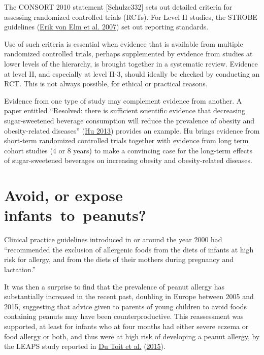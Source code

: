 \documentclass[
  10pt,
  b5paper]{book}
\begin{document}
The CONSORT 2010 statement {[}Schulzc332{]} sets out detailed criteria
for assessing randomized controlled trials (RCTs). For Level II
studies, the STROBE guidelines (\protect\hyperlink{ref-erik2007strengthening}{Erik von Elm et al. 2007}) set out
reporting standards.

Use of such criteria is essential when evidence that is available
from multiple randomized controlled trials, perhaps supplemented
by evidence from studies at lower levels of the hierarchy, is
brought together in a systematic review. Evidence at level II,
and especially at level II-3, should ideally be checked by
conducting an RCT. This is not always possible, for ethical or
practical reasons.

Evidence from one type of study may complement evidence from
another. A paper entitled ``Resolved: there is sufficient
scientific evidence that decreasing sugar-sweetened beverage
consumption will reduce the prevalence of obesity and
obesity-related diseases'' (\protect\hyperlink{ref-hu2013resolved}{Hu 2013}) provides an
example. Hu brings evidence from short-term randomized
controlled trials together with evidence from long term
cohort studies (4 or 8 years) to make a convincing case
for the long-term effects of sugar-sweetened beverages on
increasing obesity and obesity-related diseases.

\hypertarget{avoid-or-expose-infants-to-peanuts}{%
\section{Avoid, or expose infants~to~peanuts?}\label{avoid-or-expose-infants-to-peanuts}}

Clinical practice guidelines introduced in or around the
year 2000 had ``recommended the exclusion of
allergenic foods from the diets of infants at high risk for
allergy, and from the diets of their mothers during pregnancy
and lactation.''

It was then a surprise to find that
the prevalence of peanut allergy has substantially increased
in the recent past, doubling in Europe between 2005 and 2015,
suggesting that advice given to parents of young children to
avoid foods containing peanuts may have been counterproductive.
This reassessment was supported, at least for infants who
at four months had either severe eczema or food allergy or
both, and thus were at high risk of developing a peanut
allergy, by the LEAPS study reported in \protect\hyperlink{ref-du2015randomized}{Du Toit et al.} (\protect\hyperlink{ref-du2015randomized}{2015}).
\end{document}
